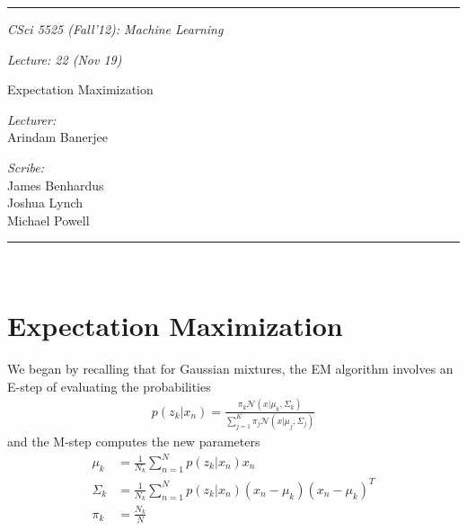 \documentclass[11pt]{article}
\newcommand{\HRule}{\rule{\linewidth}{0.5mm}}
\begin{document}
\HRule
\begin{center}
\begin{minipage}{0.5\textwidth}
\begin{flushleft} \large
\emph{CSci 5525 (Fall'12): Machine Learning}
\end{flushleft}
\end{minipage}
\hspace*{13mm}
\begin{minipage}{0.4\textwidth}
\begin{flushright} \large
\emph{Lecture: 22 (Nov 19)}
\end{flushright}
\end{minipage}
\vspace*{5mm}

{\LARGE Expectation Maximization}\\
\vspace*{5mm}

\begin{minipage}{0.4\textwidth}
\begin{flushleft} \large
\emph{Lecturer:}\\ 
Arindam Banerjee
\end{flushleft}
\end{minipage}
\hspace*{25mm}
\begin{minipage}{0.4\textwidth}
\begin{flushright} \large
\emph{Scribe:} \\
James Benhardus\\
Joshua Lynch\\
Michael Powell
\end{flushright}
\end{minipage}

\end{center}
\HRule\\

\section{Expectation Maximization}

We began by recalling that for Gaussian mixtures, the EM algorithm involves an E-step of evaluating the probabilities 
\begin{align}
p(z_{k}|x_{n}) = \frac{\pi_{k}\mathcal{N}(x|\mu_{k},\Sigma_{k})}{\sum_{j=1}^{K}\pi_{j}\mathcal{N}(x|\mu_{j},\Sigma_j)}
\end{align}
and the M-step computes the new parameters 
\begin{align}
\mu_k &= \frac{1}{N_{k}}\sum_{n=1}^{N}{p(z_{k}|x_{n})x_{n}} \\
\Sigma_{k} &= \frac{1}{N_{k}}\sum_{n=1}^{N}{p(z_{k}|x_{n})(x_{n}-\mu_{k})(x_{n}-\mu_{k})^{T}} \\
\pi_{k} &= \frac{N_{k}}{N}
\end{align}
\end{document}
